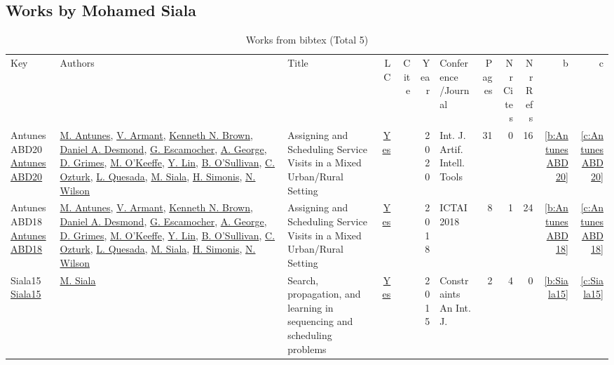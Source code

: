 \subsection{Works by Mohamed Siala}
\label{sec:a130}
{\scriptsize
\begin{longtable}{>{\raggedright\arraybackslash}p{3cm}>{\raggedright\arraybackslash}p{6cm}>{\raggedright\arraybackslash}p{6.5cm}rrrp{2.5cm}rrrrr}
\rowcolor{white}\caption{Works from bibtex (Total 5)}\\ \toprule
\rowcolor{white}Key & Authors & Title & LC & Cite & Year & \shortstack{Conference\\/Journal} & Pages & \shortstack{Nr\\Cites} & \shortstack{Nr\\Refs} & b & c \\ \midrule\endhead
\bottomrule
\endfoot
AntunesABD20 \href{https://doi.org/10.1142/S0218213020600076}{AntunesABD20} & \hyperref[auth:a891]{M. Antunes}, \hyperref[auth:a892]{V. Armant}, \hyperref[auth:a223]{Kenneth N. Brown}, \hyperref[auth:a893]{Daniel A. Desmond}, \hyperref[auth:a894]{G. Escamocher}, \hyperref[auth:a895]{A. George}, \hyperref[auth:a183]{D. Grimes}, \hyperref[auth:a896]{M. O'Keeffe}, \hyperref[auth:a897]{Y. Lin}, \hyperref[auth:a16]{B. O'Sullivan}, \hyperref[auth:a898]{C. Ozturk}, \hyperref[auth:a899]{L. Quesada}, \hyperref[auth:a130]{M. Siala}, \hyperref[auth:a17]{H. Simonis}, \hyperref[auth:a838]{N. Wilson} & Assigning and Scheduling Service Visits in a Mixed Urban/Rural Setting & \href{works/AntunesABD20.pdf}{Yes} & \cite{AntunesABD20} & 2020 & Int. J. Artif. Intell. Tools & 31 & 0 & 16 & \ref{b:AntunesABD20} & \ref{c:AntunesABD20}\\
AntunesABD18 \href{https://doi.org/10.1109/ICTAI.2018.00027}{AntunesABD18} & \hyperref[auth:a891]{M. Antunes}, \hyperref[auth:a892]{V. Armant}, \hyperref[auth:a223]{Kenneth N. Brown}, \hyperref[auth:a893]{Daniel A. Desmond}, \hyperref[auth:a894]{G. Escamocher}, \hyperref[auth:a895]{A. George}, \hyperref[auth:a183]{D. Grimes}, \hyperref[auth:a896]{M. O'Keeffe}, \hyperref[auth:a897]{Y. Lin}, \hyperref[auth:a16]{B. O'Sullivan}, \hyperref[auth:a898]{C. Ozturk}, \hyperref[auth:a899]{L. Quesada}, \hyperref[auth:a130]{M. Siala}, \hyperref[auth:a17]{H. Simonis}, \hyperref[auth:a838]{N. Wilson} & Assigning and Scheduling Service Visits in a Mixed Urban/Rural Setting & \href{works/AntunesABD18.pdf}{Yes} & \cite{AntunesABD18} & 2018 & ICTAI 2018 & 8 & 1 & 24 & \ref{b:AntunesABD18} & \ref{c:AntunesABD18}\\
Siala15 \href{https://doi.org/10.1007/s10601-015-9213-y}{Siala15} & \hyperref[auth:a130]{M. Siala} & Search, propagation, and learning in sequencing and scheduling problems & \href{works/Siala15.pdf}{Yes} & \cite{Siala15} & 2015 & Constraints An Int. J. & 2 & 4 & 0 & \ref{b:Siala15} & \ref{c:Siala15}\\

\end{longtable}}

